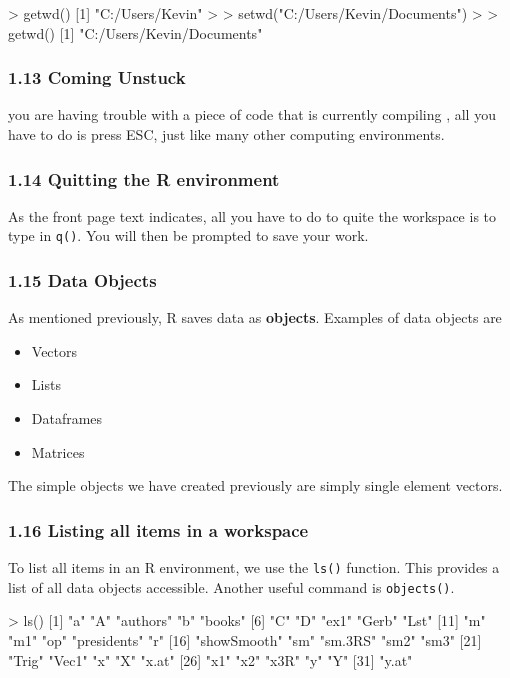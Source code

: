  > getwd()
 [1] "C:/Users/Kevin"
 >
 > setwd("C:/Users/Kevin/Documents")
 >
 > getwd()
 [1] "C:/Users/Kevin/Documents"
 
 
 \frametitle{1.13 Coming Unstuck}
 \Large
 \begin{itemize}
 \itemIf you are having trouble with a piece of code that is currently compiling , all you have to do is press ESC, just like many other computing environments.
 \end{itemize}
 
 
 \frametitle{1.14 Quitting the R environment}
 As the front page text indicates, all you have to do to quite the workspace is to type in \texttt{q()}.
 You will then be prompted to save your work.
 
 
 \frametitle{1.15 Data Objects}
 As mentioned previously, R saves data as \textbf{objects}. Examples of data objects are
 \begin{itemize}
 \item Vectors
 \item Lists
 \item Dataframes
 \item Matrices
 \end{itemize}
 The simple objects we have created previously are simply single element vectors.
 
 
 \frametitle{1.16 Listing all items in a workspace}
 To list all items in an R environment, we use the \texttt{ls()} function. This provides a list of all data
 objects accessible. Another useful command is \texttt{objects()}.
 \begin{framed}
 \begin{semiverbatim}
 > ls()
 [1] "a" "A" "authors" "b" "books"
 [6] "C" "D" "ex1" "Gerb" "Lst"
 [11] "m" "m1" "op" "presidents" "r"
 [16] "showSmooth" "sm" "sm.3RS" "sm2" "sm3"
 [21] "Trig" "Vec1" "x" "X" "x.at"
 [26] "x1" "x2" "x3R" "y" "Y"
 [31] "y.at"
 \end{semiverbatim}
 \end{framed}
 
